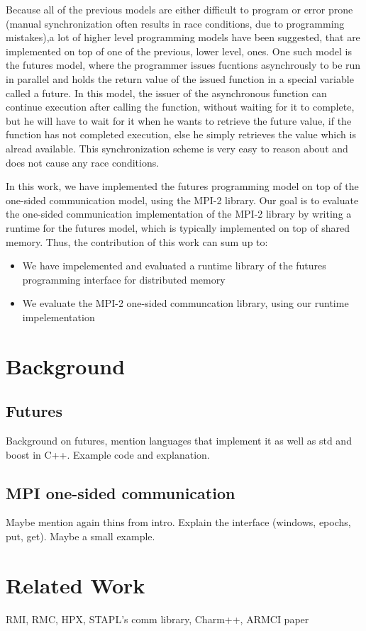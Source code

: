 Because all of the previous models are either difficult to program or error prone (manual
synchronization often results in race conditions, due to programming mistakes),a lot of higher 
level programming models have been suggested, that are implemented on top of one of the 
previous, lower level, ones.  One such model is the futures model, where the programmer issues fucntions
asynchrously to be run in parallel and holds the return value of the issued function in 
a special variable called a future.  In this model, the issuer of the asynchronous function
can continue execution after calling the function, without waiting for it to complete, but
he will have to wait for it when he wants to retrieve the future value, if the function has
not completed execution, else he simply retrieves the value which is alread available.  This 
synchronization scheme is very easy to reason about and does not cause any race conditions.


In this work, we have implemented the futures programming model on top of the one-sided communication
model, using the MPI-2 library.  Our goal is to evaluate the one-sided communication implementation 
of the MPI-2 library by writing a runtime for the futures model, which is typically implemented on top
of shared memory.   Thus, the contribution of this work can sum up to:
\\

\begin{itemize}
	\item We have impelemented and evaluated a runtime library of the futures programming interface 
	for distributed memory 
	\item We evaluate the MPI-2 one-sided communcation library, using our runtime impelementation
\end{itemize}

\section{Background}
\subsection{Futures}
\label{sect:futures}


Background on futures, mention languages that implement it as well as std and boost in C++.
Example code and explanation.

\label{sect:mpi-one-sided}
\subsection{MPI one-sided communication}
Maybe mention again thins from intro.  Explain the interface (windows, epochs, put, get).
Maybe a small example.

\section{Related Work}
RMI, RMC, HPX, STAPL's comm library, Charm++, ARMCI paper

